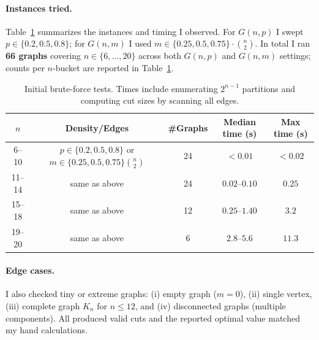 \documentclass[12pt]{article}
\begin{document}
\paragraph{Instances tried.}
Table~\ref{tab:bf-instances} summarizes the instances and timing I observed.
For $G(n,p)$ I swept $p\in\{0.2,0.5,0.8\}$; for $G(n,m)$ I used
$m\in\{0.25,0.5,0.75\}\cdot\binom{n}{2}$. In total I ran \textbf{66 graphs} covering $n\in\{6,\dots,20\}$ across both $G(n,p)$ and $G(n,m)$ settings; counts per $n$-bucket are reported in Table~\ref{tab:bf-instances}.

\begin{table}[H]
\centering
\begin{tabular}{|c|c|c|c|c|}
\hline
\textbf{$n$} & \textbf{Density/Edges} & \textbf{\#Graphs} & \textbf{Median time (s)} & \textbf{Max time (s)} \\
\hline
6--10  & $p\in\{0.2,0.5,0.8\}$ or $m\in\{0.25,0.5,0.75\}\binom{n}{2}$ & 24 & $< 0.01$ & $< 0.02$ \\
11--14 & same as above & 24 & $0.02$--$0.10$ & $0.25$ \\
15--18 & same as above & 12 & $0.25$--$1.40$ & $3.2$ \\
19--20 & same as above & 6  & $2.8$--$5.6$ & $11.3$ \\
\hline
\end{tabular}
\caption{Initial brute-force tests. Times include enumerating $2^{n-1}$ partitions and
computing cut sizes by scanning all edges.}
\label{tab:bf-instances}
\end{table}

\paragraph{Edge cases.}
I also checked tiny or extreme graphs:
(i) empty graph ($m=0$), (ii) single vertex, (iii) complete graph $K_n$ for $n\le 12$,
and (iv) disconnected graphs (multiple components). All produced valid cuts and
the reported optimal value matched my hand calculations.
\end{document}
